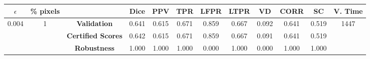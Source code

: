\begin{longtable}{ c  c | c | c  c  c  c  c  c  c c c}
\toprule \textbf{$\epsilon$} & \textbf{\% pixels} & & \textbf{Dice} & \textbf{PPV} & \textbf{TPR} & \textbf{LFPR} & \textbf{LTPR} & \textbf{VD} & \textbf{CORR} & \textbf{SC} & \textbf{V. Time} \\
\midrule 
\multirow{3}{*}{0.004}  & \multirow{3}{*}{1} &\textbf{Validation} & 0.641 & 0.615 & 0.671 & 0.859 & 0.667 & 0.092 & 0.641 & 0.519 & \multirow{3}{*}{1447} \\
 & & \textbf{Certified Scores} & 0.642 & 0.615 & 0.671 & 0.859 & 0.667 & 0.091 & 0.641 & 0.519 & \\
& & \textbf{Robustness} & 1.000 & 1.000 & 1.000 & 0.000 & 1.000 & 0.000 & 1.000 & 1.000 & \\
\end{longtable}